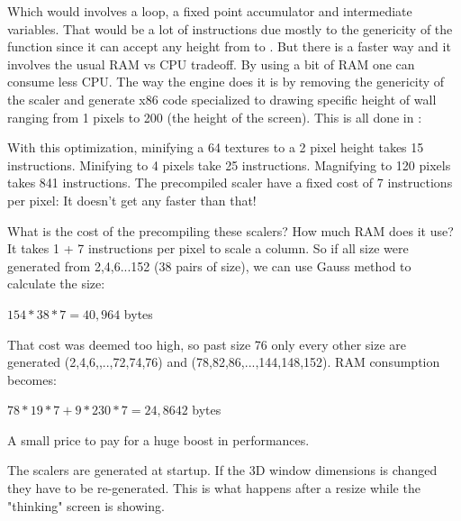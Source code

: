 \par
\begin{minipage}{\textwidth}

\end{minipage}

\par
Which would involves a loop, a fixed point accumulator and intermediate variables. That would be a lot of instructions due mostly to the genericity of the function since it can accept any height from  to . But there is a faster way and it involves the usual RAM vs CPU tradeoff. By using a bit of RAM one can consume less CPU. The way the engine does it is by removing the genericity of the scaler and generate x86 code specialized to drawing specific height of wall ranging from 1 pixels to 200 (the height of the screen). This is all done in :\\
\par
\begin{minipage}{\textwidth}

\end{minipage}
\par
With this optimization, minifying a 64 textures to a 2 pixel height takes 15 instructions. Minifying to 4 pixels take 25 instructions. Magnifying to 120 pixels takes 841 instructions. The precompiled scaler have a fixed cost of 7 instructions per pixel: It doesn't get any faster than that!\\
\par
What is the cost of the precompiling these scalers? How much RAM does it use? It takes 1 + 7 instructions per pixel to scale a column. So if all size were generated from 2,4,6...152 (38 pairs of size), we can use Gauss method to calculate the size:\\
\par
$154*38*7=40,964$ bytes\\
\par
That cost was deemed too high, so past size 76 only every other size are generated (2,4,6,,..,72,74,76) and (78,82,86,...,144,148,152). RAM consumption becomes:\\
\par
$78*19*7+9*230*7=24,8642$ bytes\\
\par
A small price to pay for a huge boost in performances.\\
\par
The scalers are generated at startup. If the 3D window dimensions is changed they have to be re-generated. This is what happens after a resize while the "thinking" screen is showing.
\begin{figure}[H]
 \centering
\end{figure}








